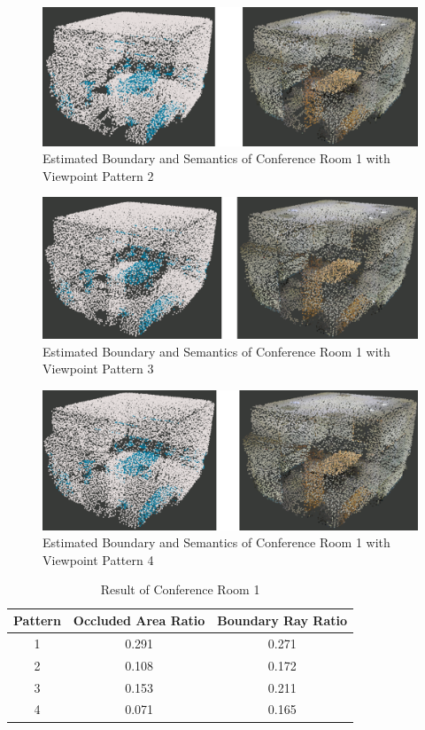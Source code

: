 \documentclass[11pt, a4paper,oneside,chapterprefix=false]{scrbook}
\begin{document}
\begin{figure}[H]
    \centering
    \includegraphics*[width=1.0\textwidth]{figures/conf1 4.png}
    \caption{Estimated Boundary and Semantics of Conference Room 1 with Viewpoint Pattern 2}
    \label{fig:conf1 4}
\end{figure}

\begin{figure}[H]
    \centering
    \includegraphics*[width=1.0\textwidth]{figures/conf1 5.png}
    \caption{Estimated Boundary and Semantics of Conference Room 1 with Viewpoint Pattern 3}
    \label{fig:conf1 5}
\end{figure}

\begin{figure}[H]
    \centering
    \includegraphics*[width=1.0\textwidth]{figures/conf1 6.png}
    \caption{Estimated Boundary and Semantics of Conference Room 1 with Viewpoint Pattern 4}
    \label{fig:conf1 6}
\end{figure}

\begin{table}[H]
    \centering
    \begin{tabular}{|c|c|c|}
        \hline
        \textbf{Pattern} & \textbf{Occluded Area Ratio} & \textbf{Boundary Ray Ratio} \\
        \hline
        1 & 0.291 & 0.271 \\
        2 & 0.108 & 0.172 \\
		3 & 0.153 & 0.211 \\
		4 & 0.071 & 0.165 \\
        \hline
    \end{tabular}
    \caption{Result of Conference Room 1}
    \label{tab:result of conference room 1}
\end{table}
\end{document}
